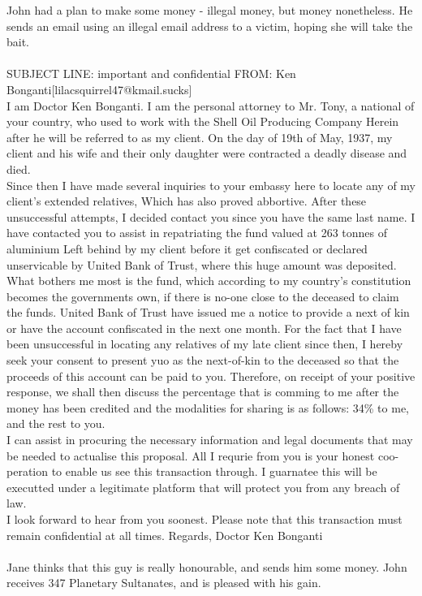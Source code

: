 \documentclass{article}
\begin{document}
John had a plan to make some money {-} illegal money, but money nonetheless.
He sends an email using an illegal email address to a victim, hoping she will take the bait.
\\\\
SUBJECT LINE: important and confidential
FROM: Ken Bonganti[lilacsquirrel47@kmail.sucks]
\\
I am Doctor Ken Bonganti.
I am the personal attorney to Mr. Tony, a national of your country, who used to work with the Shell Oil Producing Company
Herein after he will be referred to as my client.
On the day of 19th of May, 1937, my client and his wife and their only daughter were contracted a deadly disease and died.
\\
Since then I have made several inquiries to your embassy here to locate any of my client's extended relatives, Which has also proved abbortive.
After these unsuccessful attempts, I decided contact you since you have the same last name.
I have contacted you to assist in repatriating the fund valued at 263 tonnes of aluminium Left behind by my client before it get confiscated or declared unservicable by United Bank of Trust, where this huge amount was deposited.
\\
What bothers me most is the fund, which according to my country's constitution becomes the governments own, if there is no{-}one close to the deceased to claim the funds.
United Bank of Trust have issued me a notice to provide a next of kin or have the account confiscated in the next one month.
For the fact that I have been unsuccessful in locating any relatives of my late client since then, I hereby seek your consent to present yuo as the next{-}of{-}kin to the deceased so that the proceeds of this account can be paid to you.
Therefore, on receipt of your positive response, we shall then discuss the percentage that is comming to me after the money has been credited and the modalities for sharing is as follows: 34\% to me, and the rest to you.
\\
I can assist in procuring the necessary information and legal documents that may be needed to actualise this proposal.
All I requrie from you is your honest coo{-}peration to enable us see this transaction through.
I guarnatee this will be executted under a legitimate platform that will protect you from any breach of law.
\\
I look forward to hear from you soonest.
Please note that this transaction must remain confidential at all times.
Regards, Doctor Ken Bonganti
\\\\
Jane thinks that this guy is really honourable, and sends him some money.
John receives 347 Planetary Sultanates, and is pleased with his gain.
\end{document}
